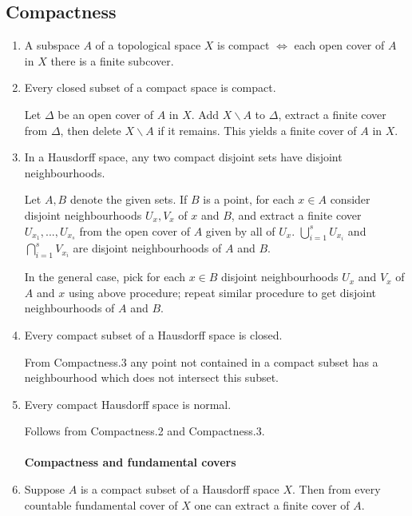 \documentclass{article}
\begin{document}
\subsection{Compactness}
\begin{enumerate}
\item A subspace \(A\) of a topological space \(X\) is compact \(\Longleftrightarrow\) each open cover of \(A\) in \(X\) there is a finite subcover.
\item Every closed subset of a compact space is compact.

Let \(\Delta\) be an open cover of \(A\) in \(X\). Add \(X\backslash A\) to \(\Delta\), extract a finite cover from \(\Delta\), then delete \(X\backslash A\) if it remains. This yields a finite cover of \(A\) in \(X\).
\item In a Hausdorff space, any two compact disjoint sets have disjoint neighbourhoods.

Let \(A,B\) denote the given sets. If \(B\) is a point, for each \(x\in A\) consider disjoint neighbourhoods \(U_{x}, V_{x}\) of \(x\) and \(B\), and extract a finite cover \(U_{x_{1}},...,U_{x_{s}}\) from the open cover of \(A\) given by all of \(U_{x}\). 
\(\bigcup_{i=1}^{s}U_{x_{i}}\) and \(\bigcap_{i=1}^{s}V_{x_{i}}\) are disjoint neighbourhoods of \(A\) and \(B\).

In the general case, pick for each \(x\in B\) disjoint neighbourhoods \(U_{x}\) and \(V_{x}\) of \(A\) and \(x\) using above procedure; repeat similar procedure to get disjoint neighbourhoods of \(A\) and \(B\).
\item Every compact subset of a Hausdorff space is closed.

From \color{gray}Compactness.3 \color{black} any point not contained in a compact subset has a neighbourhood which does not intersect this subset.
\item Every compact Hausdorff space is normal.

Follows from \color{gray}Compactness.2 \color{black} and \color{gray}Compactness.3\color{black}.
\\\\
\textbf{Compactness and fundamental covers}
\item Suppose \(A\) is a compact subset of a Hausdorff space \(X\). Then from every countable fundamental cover of \(X\) one can extract a finite cover of \(A\).


\end{enumerate}
\end{document}
